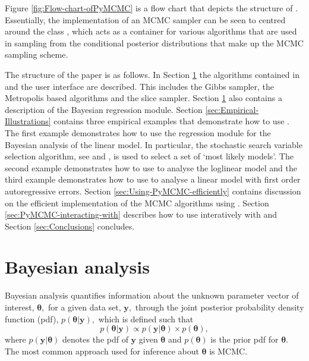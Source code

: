 \documentclass[article]{jss}
\begin{document}
Figure \ref{fig:Flow-chart-ofPyMCMC} is a flow chart that depicts
the structure of . Essentially, the implementation of an MCMC
sampler can be seen to centred around the class , which
acts as a container for various algorithms that are used in sampling
from the conditional posterior distributions that make up the MCMC
sampling scheme. 

The structure of the paper is as follows. In Section \ref{sec:Bayesian-Analysis}
the algorithms contained in  and the user interface are described.
This includes the Gibbs sampler, the Metropolis based algorithms and
the slice sampler. Section \ref{sec:Bayesian-Analysis} also contains
a description of the Bayesian regression module. Section \ref{sec:Empirical-Illustrations}
contains three empirical examples that demonstrate how to use .
The first example demonstrates how to use the regression module for
the Bayesian analysis of the linear model. In particular, the stochastic
search variable selection algorithm, see \citet{GeorgeMcCulloch1993}
and \citet{MarinRobert2007}, is used to select a set of `most likely
models'. The second example demonstrates how to use  to analyse
the loglinear model and the third example demonstrates how to use
 to analyse a linear model with first order autoregressive errors.
Section \ref{sec:Using-PyMCMC-efficiently} contains discussion on
the efficient implementation of the MCMC algorithms using .
Section \ref{sec:PyMCMC-interacting-with} describes how to use 
interatively with  and Section \ref{sec:Conclusions} concludes.


\section{Bayesian analysis}
\label{sec:Bayesian-Analysis}

Bayesian analysis quantifies information about the unknown parameter
vector of interest, $\bm{\theta},$ for a given data set, $\bm{y},$
through the joint posterior probability density function (pdf),
$p(\bm{\theta}|\bm{y}),$ which is defined such that \begin{equation}
  p(\bm{\theta}|\bm{y})\propto p(\bm{y}|\bm{\theta})\times
  p(\bm{\theta}),\label{eq:joint post}\end{equation} where
$p(\bm{y}|\bm{\theta})$ denotes the pdf of $\bm{y}$ given
$\bm{\theta}$ and $p(\bm{\theta})$ is the prior pdf for $\bm{\theta}.$
The most common approach used for inference about $\bm{\theta}$ is
MCMC.
\end{document}
